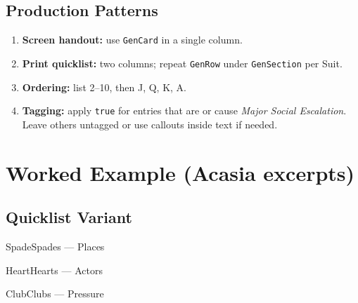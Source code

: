 \subsection*{Production Patterns}
\begin{enumerate}
\item \textbf{Screen handout:} use \texttt{GenCard} in a single column.
\item \textbf{Print quicklist:} two columns; repeat \texttt{GenRow} under \texttt{GenSection} per Suit.
\item \textbf{Ordering:} list 2–10, then J, Q, K, A.
\item \textbf{Tagging:} apply \texttt{true} for entries that are or cause \emph{Major Social Escalation}. Leave others untagged or use \texttt{\MinorTag} callouts inside text if needed.
\end{enumerate}

\section*{Worked Example (Acasia excerpts)}
\subsection*{Quicklist Variant}
\begin{multicols}{2}
\begin{GenSection}{Spade}{Spades — Places}
\end{GenSection}

\begin{GenSection}{Heart}{Hearts — Actors}
\end{GenSection}

\begin{GenSection}{Club}{Clubs — Pressure}
\end{GenSection}
\end{multicols}


